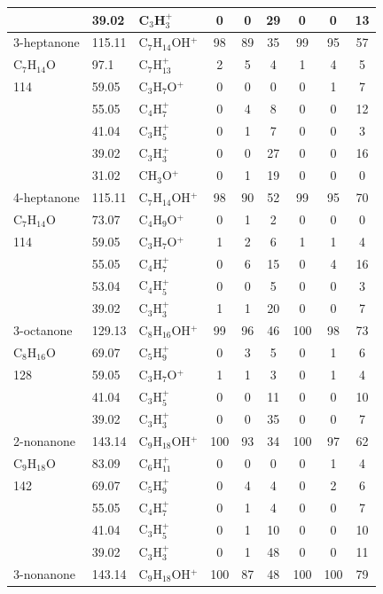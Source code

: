 {\begin{longtable}[c]{lllcccccc}
 & 39.02 & C$_3$H$_{3}^+$ & 0 & 0 & 29 & 0 & 0 & 13 \\ \hline
3-heptanone & 115.11 & C$_7$H$_{14}$OH$^+$ & 98 & 89 & 35 & 99 & 95 & 57 \\
C$_7$H$_{14}$O & 97.1 & C$_7$H$_{13}^+$ & 2 & 5 & 4 & 1 & 4 & 5 \\
114 & 59.05 & C$_3$H$_{7}$O$^+$ & 0 & 0 & 0 & 0 & 1 & 7 \\
 & 55.05 & C$_4$H$_{7}^+$ & 0 & 4 & 8 & 0 & 0 & 12 \\
 & 41.04 & C$_3$H$_{5}^+$ & 0 & 1 & 7 & 0 & 0 & 3 \\
 & 39.02 & C$_3$H$_{3}^+$ & 0 & 0 & 27 & 0 & 0 & 16 \\
 & 31.02 & CH$_{3}$O$^+$ & 0 & 1 & 19 & 0 & 0 & 0 \\ \hline
4-heptanone & 115.11 & C$_7$H$_{14}$OH$^+$ & 98 & 90 & 52 & 99 & 95 & 70 \\
C$_7$H$_{14}$O & 73.07 & C$_4$H$_{9}$O$^+$ & 0 & 1 & 2 & 0 & 0 & 0 \\
114 & 59.05 & C$_3$H$_{7}$O$^+$ & 1 & 2 & 6 & 1 & 1 & 4 \\
 & 55.05 & C$_4$H$_{7}^+$ & 0 & 6 & 15 & 0 & 4 & 16 \\
 & 53.04 & C$_4$H$_{5}^+$ & 0 & 0 & 5 & 0 & 0 & 3 \\
 & 39.02 & C$_3$H$_{3}^+$ & 1 & 1 & 20 & 0 & 0 & 7 \\ \hline
3-octanone & 129.13 & C$_8$H$_{16}$OH$^+$ & 99 & 96 & 46 & 100 & 98 & 73 \\
C$_8$H$_{16}$O & 69.07 & C$_5$H$_{9}^+$ & 0 & 3 & 5 & 0 & 1 & 6 \\
128 & 59.05 & C$_3$H$_{7}$O$^+$ & 1 & 1 & 3 & 0 & 1 & 4 \\
 & 41.04 & C$_3$H$_{5}^+$ & 0 & 0 & 11 & 0 & 0 & 10 \\
 & 39.02 & C$_3$H$_{3}^+$ & 0 & 0 & 35 & 0 & 0 & 7 \\ \hline
2-nonanone & 143.14 & C$_9$H$_{18}$OH$^+$ & 100 & 93 & 34 & 100 & 97 & 62 \\
C$_9$H$_{18}$O & 83.09 & C$_6$H$_{11}^+$ & 0 & 0 & 0 & 0 & 1 & 4 \\
142 & 69.07 & C$_5$H$_{9}^+$ & 0 & 4 & 4 & 0 & 2 & 6 \\
 & 55.05 & C$_4$H$_{7}^+$ & 0 & 1 & 4 & 0 & 0 & 7 \\
 & 41.04 & C$_3$H$_{5}^+$ & 0 & 1 & 10 & 0 & 0 & 10 \\
 & 39.02 & C$_3$H$_{3}^+$ & 0 & 1 & 48 & 0 & 0 & 11 \\ \hline
3-nonanone & 143.14 & C$_9$H$_{18}$OH$^+$ & 100 & 87 & 48 & 100 & 100 & 79 \\

\end{longtable}}
